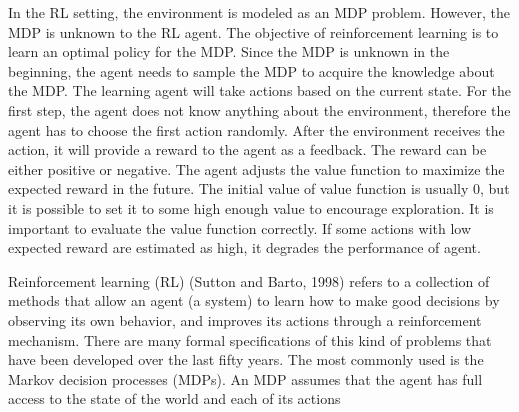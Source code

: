
In the RL setting, the environment is modeled as an MDP problem.
However, the MDP is unknown to the RL agent. The objective of reinforcement learning is to 
learn an optimal policy for the MDP. Since the MDP is unknown in the beginning, 
the agent needs to sample the MDP to acquire the knowledge about the MDP.
The learning agent will take actions based on the current state. For the first step, the agent does not know anything about 
the environment, therefore the agent has to choose the first action randomly. After the environment
receives the action, it will provide a reward to the agent as a feedback. The reward can be either
positive or negative. The agent adjusts the value function to maximize the expected reward in the future.
The initial value of value function is 
usually 0, but it is possible to set it to some high enough value to encourage exploration.
It is important to evaluate the value function 
correctly. If some actions with low expected reward are estimated as high, it degrades the
performance of agent.

Reinforcement learning (RL) (Sutton and Barto, 1998) refers to a collection of methods
that allow an agent (a system) to learn how to make good decisions by observing its
own behavior, and improves its actions through a reinforcement mechanism. There are
many formal specifications of this kind of problems that have been developed over the last
fifty years. The most commonly used is the Markov decision processes (MDPs). An
MDP assumes that the agent has full access to the state of the world and each of its actions



